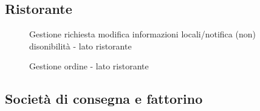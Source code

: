 \documentclass[11pt]{article} %
\begin{document}
\subsection{Ristorante}
\label{bpmn:restaurant}

\begin{figure}[H]
\begin{center}
\caption{Gestione richiesta modifica informazioni locali/notifica (non) disonibilità - lato ristorante}
\end{center}
\end{figure}


\begin{figure}[H]
\begin{center}
\caption{Gestione ordine - lato ristorante}
\end{center}
\end{figure}

\subsection{Società di consegna e fattorino}
\label{bpmn:deliver}
\end{document}
